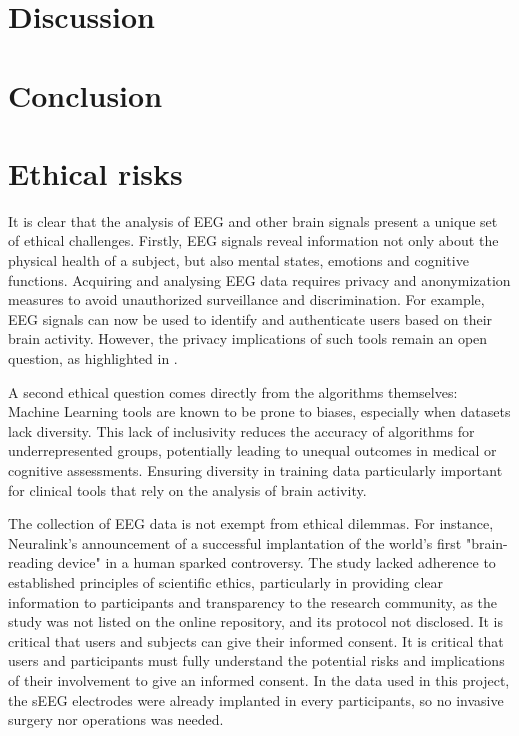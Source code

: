 \documentclass[10pt,conference,compsocconf]{IEEEtran}
\begin{document}
\section{Discussion}
\label{sec:discussion}

\section{Conclusion}
\label{sec:conclusion}


\section{Ethical risks}
It is clear that the analysis of EEG and other brain signals present a unique set of ethical challenges. Firstly, EEG signals reveal information not only about the physical health of a subject, but also mental states, emotions and cognitive functions. Acquiring and analysing EEG data requires privacy and anonymization measures to avoid unauthorized surveillance and discrimination. For example, EEG signals can now be used to identify and authenticate users based on their brain activity. However, the privacy implications of such tools remain an open question, as highlighted in \cite{eeg_authentication}.

A second ethical question comes directly from the algorithms themselves: Machine Learning tools are known to be prone to biases, especially when datasets lack diversity. This lack of inclusivity reduces the accuracy of algorithms for underrepresented groups, potentially leading to unequal outcomes in medical or cognitive assessments. Ensuring diversity in training data particularly important for clinical tools that rely on the analysis of brain activity.

The collection of EEG data is not exempt from ethical dilemmas. For instance, Neuralink’s announcement of a successful implantation of the world’s first "brain-reading device" in a human sparked controversy. The study lacked adherence to established principles of scientific ethics, particularly in providing clear information to participants and transparency to the research community, as the study was not listed on the online repository, and its protocol not disclosed. It is critical that users and subjects can give their informed consent. It is critical that users and participants must fully understand the potential risks and implications of their involvement to give an informed consent. In the data used in this project, the sEEG electrodes were already implanted in every participants, so no invasive surgery nor operations was needed.
\end{document}
